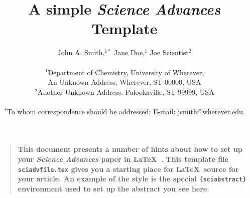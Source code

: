 \documentclass[12pt]{article}
\title{A simple {\it Science Advances\/} Template}
\author
{John A. Smith,${}^{1\ast}$ Jane Doe,${}^{1}$ Joe Scientist${}^{2}$\\
\\
\normalsize{${}^{1}$Department of Chemistry, University of Wherever,}\\
\normalsize{An Unknown Address, Wherever, ST 00000, USA}\\
\normalsize{${}^{2}$Another Unknown Address, Palookaville, ST 99999, USA}\\
\\
\normalsize{$^\ast$To whom correspondence should be addressed; E-mail:  jsmith@wherever.edu.}
}
\date{}
\newenvironment{sciabstract}{%
\begin{quote} \bf}
{\end{quote}}
\begin{document}
 


\baselineskip24pt


\maketitle 





\begin{sciabstract}
  This document presents a number of hints about how to set up your
  {\it Science Advances\/} paper in \LaTeX\ .  This template file
  \texttt{sciadvfile.tex} gives you a starting place for \LaTeX\ source
  for your article.  An example of the style is the special
  \texttt{\{sciabstract\}} environment used to set up the abstract you
  see here.
\end{sciabstract}



\end{document}
